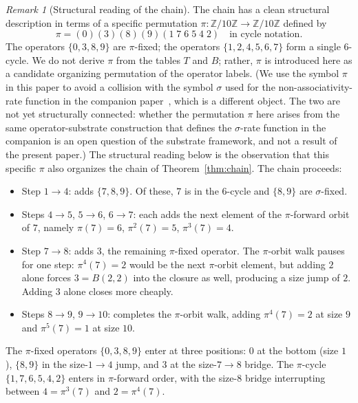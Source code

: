\documentclass[11pt,reqno]{amsart}
\theoremstyle{plain}
\theoremstyle{definition}
\theoremstyle{remark}
\newtheorem*{remark}{Remark}
\newcommand{\Z}{\mathbb{Z}}
\newcommand{\Zten}{\Z/10\Z}
\begin{document}
\begin{remark}[Structural reading of the chain]\label{rem:sigma-walk}
The chain has a clean structural description in terms of a specific
permutation $\pi:\Zten\to\Zten$ defined by
\begin{equation}\label{eq:pi}
\pi=(0)(3)(8)(9)(1\;7\;6\;5\;4\;2)
\quad\text{in cycle notation.}
\end{equation}
The operators $\{0,3,8,9\}$ are $\pi$-fixed; the operators
$\{1,2,4,5,6,7\}$ form a single $6$-cycle. We do not derive
$\pi$ from the tables $T$ and $B$; rather, $\pi$ is introduced
here as a candidate organizing permutation of the operator
labels. (We use the symbol $\pi$ in this paper to avoid a
collision with the symbol $\sigma$ used for the
non-associativity-rate function in the companion
paper~\cite{SandersGish2026Sigma}, which is a different object.
The two are not yet structurally connected: whether the
permutation $\pi$ here arises from the same operator-substrate
construction that defines the $\sigma$-rate function in the
companion is an open question of the substrate framework, and
not a result of the present paper.) The structural reading below
is the observation that this specific $\pi$ also organizes the
chain of Theorem~\ref{thm:chain}. The chain proceeds:
\begin{itemize}\setlength\itemsep{0pt}
\item Step $1\to 4$: adds $\{7,8,9\}$. Of these, $7$ is in the
$6$-cycle and $\{8,9\}$ are $\sigma$-fixed.
\item Steps $4\to 5$, $5\to 6$, $6\to 7$: each adds the next
element of the $\pi$-forward orbit of $7$, namely
$\pi(7)=6$, $\pi^{2}(7)=5$, $\pi^{3}(7)=4$.
\item Step $7\to 8$: adds $3$, the remaining $\pi$-fixed
operator. The $\pi$-orbit walk pauses for one step:
$\pi^{4}(7)=2$ would be the next $\pi$-orbit element, but
adding $2$ alone forces $3=B(2,2)$ into the closure as well,
producing a size jump of $2$. Adding $3$ alone closes more
cheaply.
\item Steps $8\to 9$, $9\to 10$: completes the $\pi$-orbit
walk, adding $\pi^{4}(7)=2$ at size $9$ and
$\pi^{5}(7)=1$ at size $10$.
\end{itemize}
The $\pi$-fixed operators $\{0,3,8,9\}$ enter at three
positions: $0$ at the bottom (size $1$), $\{8,9\}$ in the
size-$1\to 4$ jump, and $3$ at the size-$7\to 8$ bridge. The
$\pi$-cycle $\{1,7,6,5,4,2\}$ enters in $\pi$-forward order,
with the size-$8$ bridge interrupting between
$4=\pi^{3}(7)$ and $2=\pi^{4}(7)$.
\end{remark}
\end{document}
